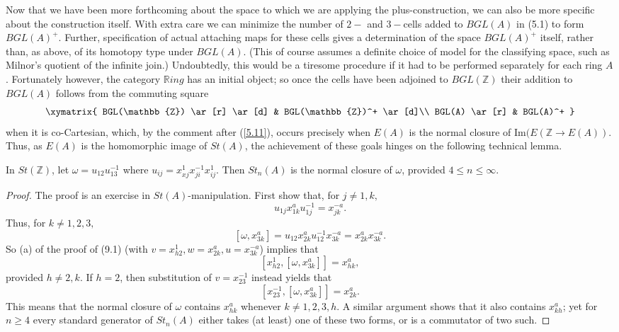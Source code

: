 Now that we have been more forthcoming about the space to which we are applying the plus-construction, we can also be more specific about the construction itself. With extra care we can minimize the number of $2-$ and $3-$cells added to $BGL(A)$ in (5.1) to form $BGL(A)^+$. Further, specification of actual attaching maps for these cells gives a determination of the space $BGL(A)^+$ itself, rather than, as above, of its homotopy type under $BGL(A)$. (This of course assumes a definite choice of model for the classifying space, such as Milnor's quotient of the infinite join.) Undoubtedly, this would be a tiresome procedure if it had to be performed separately for each ring $A$. Fortunately however, the category $\mathbb{R}ing$ has an initial object; so once the cells have been adjoined to $BGL(\mathbb{Z})$ their addition to $BGL(A)$ follows from the commuting square
\begin{equation}
 \xymatrix{
BGL(\mathbb{Z}) \ar[r] \ar[d] & BGL(\mathbb{Z})^+ \ar[d]\\
BGL(A) \ar[r] & BGL(A)^+
} 
\end{equation}
when it is co-Cartesian, which, by the comment after (\ref{5.11}), occurs precisely when $E(A)$ is the normal closure of $\textrm{Im}(E(\mathbb{Z}\longrightarrow E(A))$. Thus, as $E(A)$ is the homomorphic image of $St(A)$, the achievement of these goals hinges on the following technical lemma.
\begin{lemma}
  In $St(\mathbb{Z})$, let $\omega=u_{12}u_{13}^{-1}$ where $u_{ij}=x_{xj}^1x_{ji}^{-1}x_{ij}^1$. Then $St_n(A)$ is the normal closure of $\omega$, provided $4\leqslant n \leqslant \infty$.
\end{lemma}
\begin{proof}
  The proof is an exercise in $St(A)$-manipulation. First show that, for $j\neq 1,k,$
  \[u_{1j}x_{1k}^au_{1j}^{-1}=x_{jk}^{-a}.\]
  Thus, for $k\neq 1,2,3,$
  \[[\omega, x_{3k}^a]=u_{12}x_{2k}^au_{12}^{-1}x_{3k}^{-a}=x_{2k}^ax_{3k}^{-a}.\]
  So (a) of the proof of (9.1) (with $v=x_{h2}^1, w=x_{2k}^a, u=x_{3k}^{-a}$) implies that
  \[[x_{h2}^1, [\omega, x_{3k}^a]]=x_{hk}^a,\]
  provided $h\neq 2,k$. If $h=2$, then substitution of $v=x_{23}^{-1}$ instead yields that
  \[[x_{23}^{-1}, [\omega, x_{3k}^a]]=x_{2k}^a.\]
  This means that the normal closure of $\omega$ contains $x_{hk}^a$ whenever $k\neq 1,2,3,h$. A similar argument shows that it also contains $x_{kh}^a$; yet for $n\geqslant 4$ every standard generator of $St_n(A)$ either takes (at least) one of these two forms, or is a commutator of two such.
\end{proof}
